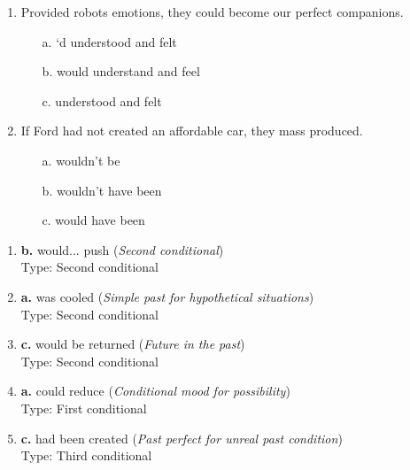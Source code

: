 \begin{enumerate}
      \item Provided robots \underline{\hspace{2cm}} emotions, they could become our perfect companions.
            \begin{enumerate}
                  \item[a.] ‘d understood and felt
                  \item[b.] would understand and feel
                  \item[c.] understood and felt
            \end{enumerate}

      \item If Ford had not created an affordable car, they \underline{\hspace{2cm}} mass produced.
            \begin{enumerate}
                  \item[a.] wouldn’t be
                  \item[b.] wouldn’t have been
                  \item[c.] would have been
            \end{enumerate}
\end{enumerate}

\begin{enumerate}
      \item \textbf{b.} would... push (\textit{Second conditional}) \\
            Type: Second conditional

      \item \textbf{a.} was cooled (\textit{Simple past for hypothetical situations}) \\
            Type: Second conditional

      \item \textbf{c.} would be returned (\textit{Future in the past}) \\
            Type: Second conditional

      \item \textbf{a.} could reduce (\textit{Conditional mood for possibility}) \\
            Type: First conditional

      \item \textbf{c.} had been created (\textit{Past perfect for unreal past condition}) \\
            Type: Third conditional
\end{enumerate}

